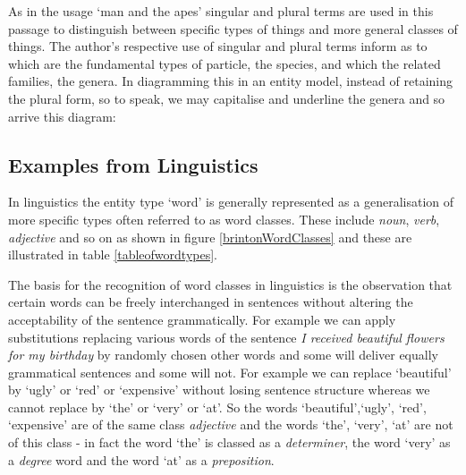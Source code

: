 \noindent As in the usage `man and the apes' singular and plural terms are used in this passage to distinguish  between specific types of things and more general classes of things. The author's respective use of singular and plural terms inform as to which are the fundamental types of particle, the species, and which the related families, the genera. In diagramming this in an entity model, instead of retaining the plural form, so to speak, we may capitalise and underline the genera and so arrive this diagram:\\

\subsection{Examples from Linguistics}
\label{typesOfWord}
\noindent In linguistics the entity type `word' is generally represented as a generalisation of more specific types often referred to as word classes. These include \textit{noun}, \textit{verb}, \textit{adjective} and so on as shown in figure \ref{brintonWordClasses} and these are illustrated in table \ref{tableofwordtypes}.

\noindent The basis for the recognition of word classes in linguistics is the observation that certain words can be freely interchanged in sentences without altering the acceptability of the sentence grammatically.  For example we can apply substitutions replacing various words of the sentence   
\textit{ I received beautiful flowers for my birthday} by randomly chosen other words
and some will deliver equally grammatical sentences and some will not. For example we can replace `beautiful' by `ugly' or `red' or `expensive' without losing sentence structure whereas we cannot replace by `the' or `very' or `at'. So the words `beautiful',`ugly', `red', `expensive' are of the same class \textit{adjective} and the words `the', `very', `at' are not of this class - in fact the word `the' is classed as a \textit{determiner}, the word `very' as a \textit{degree} word and the word `at' as a \textit{preposition}.\\


